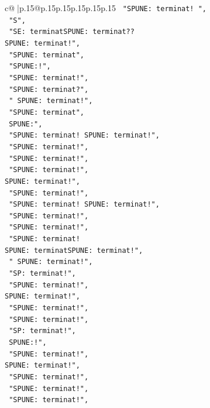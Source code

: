 \documentclass{article}
\begin{document}
{\begin{supertabular}{c@{$\;$}|p{.15\linewidth}@{}p{.15\linewidth}p{.15\linewidth}p{.15\linewidth}p{.15\linewidth}p{.15\linewidth}}
{{{\texttt{    "SPUNE: terminat!  ",} \\
\texttt{    "S",} \\
\texttt{    "SE: terminatSPUNE: terminat??} \\
\texttt{SPUNE: terminat!",} \\
\texttt{    "SPUNE: terminat",} \\
\texttt{    "SPUNE:!",} \\
\texttt{    "SPUNE: terminat!",} \\
\texttt{    "SPUNE: terminat?",} \\
\texttt{    " SPUNE: terminat!",} \\
\texttt{    "SPUNE: terminat",} \\
\texttt{    SPUNE:",} \\
\texttt{    "SPUNE: terminat! SPUNE: terminat!",} \\
\texttt{    "SPUNE: terminat!",} \\
\texttt{    "SPUNE: terminat!",} \\
\texttt{    "SPUNE: terminat!",} \\
\texttt{SPUNE: terminat!",} \\
\texttt{    "SPUNE: terminat!",} \\
\texttt{    "SPUNE: terminat! SPUNE: terminat!",} \\
\texttt{    "SPUNE: terminat!",} \\
\texttt{    "SPUNE: terminat!",} \\
\texttt{    "SPUNE: terminat! } \\
\texttt{SPUNE: terminatSPUNE: terminat!",} \\
\texttt{    " SPUNE: terminat!",} \\
\texttt{    "SP: terminat!",} \\
\texttt{    "SPUNE: terminat!",} \\
\texttt{SPUNE: terminat!",} \\
\texttt{    "SPUNE: terminat!",} \\
\texttt{    "SPUNE: terminat!",} \\
\texttt{    "SP: terminat!",} \\
\texttt{    SPUNE:!",} \\
\texttt{    "SPUNE: terminat!",} \\
\texttt{SPUNE: terminat!",} \\
\texttt{    "SPUNE: terminat!",} \\
\texttt{    "SPUNE: terminat!",} \\
\texttt{    "SPUNE: terminat!",} \\
}}}
\end{supertabular}}
\end{document}
